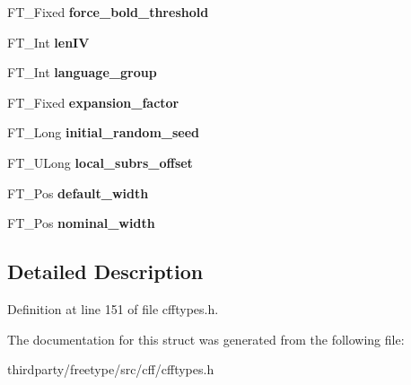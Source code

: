 \begin{DoxyCompactItemize}
\item 
\mbox{\label{struct_c_f_f___private_rec___ad69b4ba0aa06ff07d0f9b3c5976823e0}} 
F\+T\+\_\+\+Fixed {\bfseries force\+\_\+bold\+\_\+threshold}
\item 
\mbox{\label{struct_c_f_f___private_rec___a51050ed5a3651b84310874ce1ca58b7d}} 
F\+T\+\_\+\+Int {\bfseries len\+IV}
\item 
\mbox{\label{struct_c_f_f___private_rec___a120626003e63919f417ab81781b88eb4}} 
F\+T\+\_\+\+Int {\bfseries language\+\_\+group}
\item 
\mbox{\label{struct_c_f_f___private_rec___ae3027c426268230846e1cc6e0a649d80}} 
F\+T\+\_\+\+Fixed {\bfseries expansion\+\_\+factor}
\item 
\mbox{\label{struct_c_f_f___private_rec___a5918411de0744d71a085f8b324fa69c1}} 
F\+T\+\_\+\+Long {\bfseries initial\+\_\+random\+\_\+seed}
\item 
\mbox{\label{struct_c_f_f___private_rec___afb51c6902a55f2dc6b4135f165a970c5}} 
F\+T\+\_\+\+U\+Long {\bfseries local\+\_\+subrs\+\_\+offset}
\item 
\mbox{\label{struct_c_f_f___private_rec___adcb4cd9c46009970b133fabe9cdaa4c4}} 
F\+T\+\_\+\+Pos {\bfseries default\+\_\+width}
\item 
\mbox{\label{struct_c_f_f___private_rec___aa1b8270b92aa646ad76e935875393794}} 
F\+T\+\_\+\+Pos {\bfseries nominal\+\_\+width}
\end{DoxyCompactItemize}


\subsection{Detailed Description}


Definition at line 151 of file cfftypes.\+h.



The documentation for this struct was generated from the following file\+:\begin{DoxyCompactItemize}
\item 
thirdparty/freetype/src/cff/cfftypes.\+h\end{DoxyCompactItemize}
